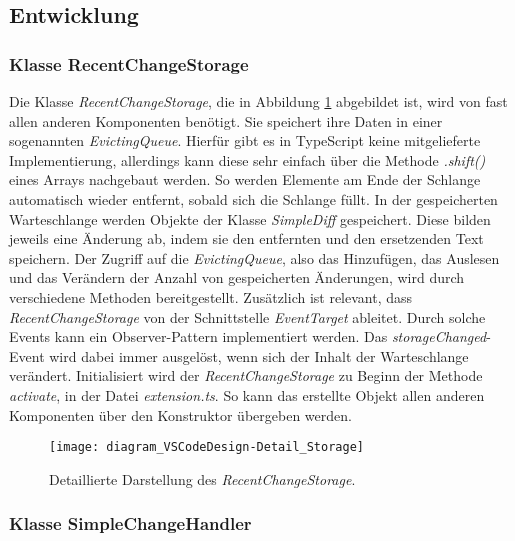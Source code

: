 \subsection{Entwicklung}

\subsubsection{Klasse RecentChangeStorage}

Die Klasse \emph{RecentChangeStorage}, 
die in Abbildung \ref{fig:diagram_VSCodeDesign-Detail_Storage} abgebildet ist,
wird von fast allen anderen Komponenten benötigt. Sie speichert ihre
Daten in einer sogenannten \emph{EvictingQueue}. Hierfür gibt es in
TypeScript keine mitgelieferte Implementierung, allerdings kann
diese sehr einfach über die Methode \emph{.shift()} eines Arrays
nachgebaut werden. So werden Elemente am Ende der Schlange automatisch
wieder entfernt, sobald sich die Schlange füllt. 
In der gespeicherten Warteschlange werden
Objekte der Klasse \emph{SimpleDiff} gespeichert. Diese bilden jeweils
eine Änderung ab, indem sie den entfernten und den ersetzenden Text
speichern. Der Zugriff auf die \emph{EvictingQueue}, also das Hinzufügen, 
das Auslesen und das Verändern der Anzahl von gespeicherten
Änderungen, wird durch verschiedene Methoden bereitgestellt.
Zusätzlich ist relevant, dass \emph{RecentChangeStorage} von der
Schnittstelle \emph{EventTarget} ableitet. Durch solche Events
kann ein Observer-Pattern implementiert werden. Das 
\emph{storageChanged}-Event wird dabei immer ausgelöst, 
wenn sich der Inhalt der Warteschlange
verändert. Initialisiert wird der \emph{RecentChangeStorage} zu Beginn der
Methode \emph{activate}, in der Datei \emph{extension.ts}. So kann
das erstellte Objekt allen anderen Komponenten über den Konstruktor
übergeben werden.

\begin{figure}
    \centering
    \texttt{[image: diagram\_VSCodeDesign-Detail\_Storage]}
    \caption{Detaillierte Darstellung des \emph{RecentChangeStorage}.}
    \label{fig:diagram_VSCodeDesign-Detail_Storage}
\end{figure}   

\subsubsection{Klasse SimpleChangeHandler}

